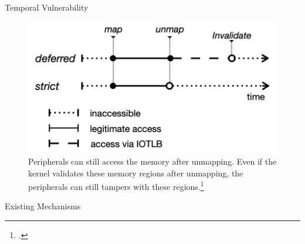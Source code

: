 \documentclass[10pt,aspectratio=169,mathserif]{beamer}
\begin{document}
\begin{frame}{Temporal Vulnerability}
	\begin{figure}
		\centering
		\includegraphics[width=0.6\linewidth]{./images/temporal.png}
		\caption{Peripherals can still access the memory after unmapping. Even if the kernel validates these memory regions after unmapping, the peripherals can still tampers with these regions.\footcite{char}}
	\end{figure}
\end{frame}

\begin{frame}{Existing Mechanisms}
\end{frame}


\end{document}
